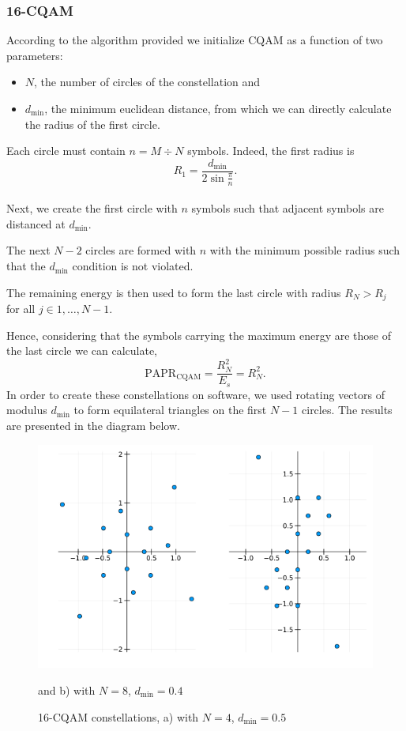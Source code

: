 \documentclass[11pt,a4paper,onecolumn,final]{article}
\newcommand{\dmin}{d_\text{min}}
\begin{document}
\subsubsection*{16-CQAM}
According to the algorithm provided \cite{cqam} we initialize CQAM as a function of two parameters: 
\begin{itemize}
    \item \(N\), the number of circles of the constellation and
    \item \(d_\text{min}\), the minimum euclidean distance, from which we can directly calculate the radius of the first circle. 
\end{itemize}
Each circle must contain \(n = M \div N \) symbols. Indeed, the first radius is 
\begin{equation}
    R_1 = \frac{d_\text{min} }{2\sin \frac{\pi}{ n}}.
\end{equation}\\ 
Next, we create the first circle with \(n \) symbols such that adjacent symbols are distanced at \(d_\text{min}\). 

The next \(N-2\) circles are formed with \(n\) with the minimum possible radius such that the \(d_\text{min}\) condition is not violated. 

The remaining energy is then used to form the last circle with radius \(R_N > R_j\) \\ for all \(j \in 1,\ldots , N-1\).

Hence, considering that the symbols carrying the maximum energy are those of the last circle we can calculate,  
\begin{equation}
    \text{PAPR}_\text{CQAM} = \frac{R_N^2}{E_s } = R_N^2. 
\end{equation}
In order to create these constellations on software, we used rotating vectors of modulus \(d_\text{min}\) to form equilateral triangles on the first \(N-1\) circles. The results are presented in the diagram below. 

\begin{figure}[h]
    \centering
    \includegraphics[scale=0.6]{16cqam_dual.png}
    \caption{16-CQAM constellations, a) with \(N=4\), \(\dmin = 0.5\)} and b) with \(N=8\), \(\dmin = 0.4\)
\end{figure}
\end{document}
